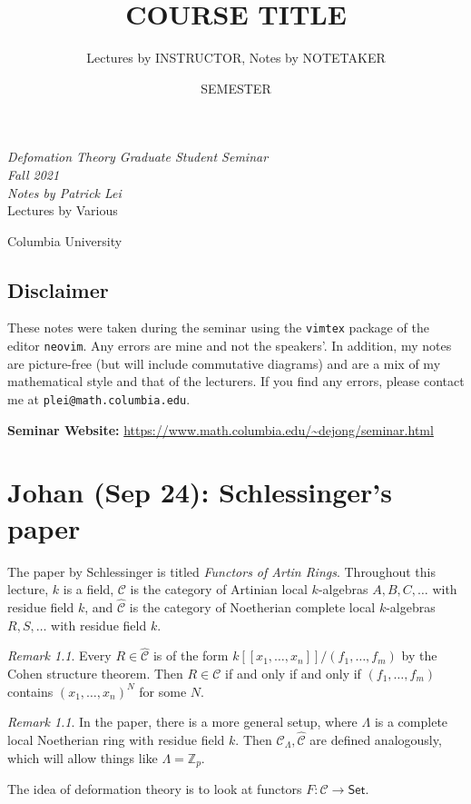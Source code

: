 \documentclass[leqno, openany]{memoir}
\title{COURSE TITLE}
\author{Lectures by INSTRUCTOR, Notes by NOTETAKER}
\date{SEMESTER}
\theoremstyle{definition}
\theoremstyle{remark}
\newtheorem{rmk}[thm]{Remark}
\theoremstyle{plain}
\theoremstyle{definition}
\theoremstyle{remark}
\newcommand{\Z}{\mathbb{Z}}
\newcommand{\mc}[1]{\mathcal{#1}}
\newcommand{\ms}[1]{\mathsf{#1}}
\newcommand{\wh}[1]{\widehat{#1}}
\newcommand*{\titleSW}
    {\begingroup%
    \raggedleft
    \vspace*{\baselineskip}
    {\Huge\itshape Defomation Theory Graduate Student Seminar \\ Fall 2021}\\[\baselineskip]
    {\large\itshape Notes by Patrick Lei}\\[0.2\textheight]
    {\Large Lectures by Various}\par
    \vfill
    {\Large \sffamily Columbia University}
    \vspace*{\baselineskip}
\endgroup}
\begin{document}
    
\begin{titlingpage}
\titleSW
\end{titlingpage}

\thispagestyle{empty}
\section*{Disclaimer}%
\label{sec:disclaimer}

These notes were taken during the seminar using the \texttt{vimtex} package of the editor \texttt{neovim}. 
Any errors are mine and not the speakers'. 
In addition, my notes are picture-free (but will include commutative diagrams) and are a mix of my mathematical style and that of the lecturers.
If you find any errors, please contact me at \texttt{plei@math.columbia.edu}.

\vspace*{1cm}

\noindent\textbf{Seminar Website:}  \url{https://www.math.columbia.edu/~dejong/seminar.html}
\newpage

\tableofcontents

\chapter{Johan (Sep 24): Schlessinger's paper}%
\label{cha:johan_sep_24_schlessinger_s_paper}

The paper by Schlessinger is titled \textit{Functors of Artin Rings}. Throughout this lecture, $k$ is a field, $\mc{C}$ is the category of Artinian local $k$-algebras $A, B, C, \ldots$ with residue field $k$, and $\wh{\mc{C}}$ is the category of Noetherian complete local $k$-algebras $R, S, \ldots$ with residue field $k$.

\begin{rmk}
    Every $R \in \wh{\mc{C}}$ is of the form $k[[x_1, \ldots, x_n]] / (f_1, \ldots, f_m)$ by the Cohen structure theorem. Then $R \in \mc{C}$ if and only if and only if $(f_1, \ldots, f_m)$ contains ${(x_1, \ldots, x_n)}^N$ for some $N$.
\end{rmk}

\begin{rmk}
    In the paper, there is a more general setup, where $\Lambda$ is a complete local Noetherian ring with residue field $k$. Then $\mc{C}_{\Lambda}, \wh{\mc{C}}$ are defined analogously, which will allow things like $\Lambda = \Z_p$.
\end{rmk}

The idea of deformation theory is to look at functors $F \colon \mc{C} \to \ms{Set}$.
\end{document}
